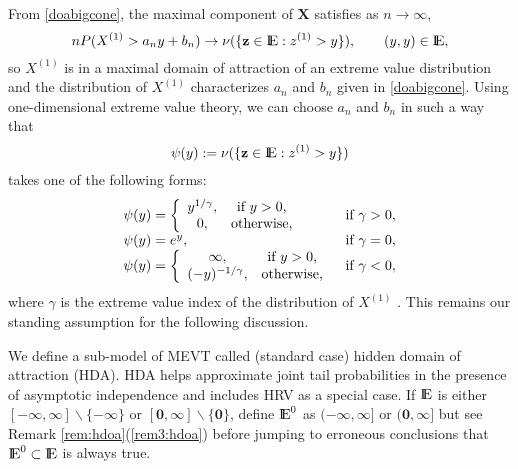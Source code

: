 \documentclass[11 pt]{amsart}
\numberwithin{equation}{section}
\begin{document}
{}From \eqref{doabigcone}, the maximal component of ${\boldsymbol X}$ satisfies as
$n\to\infty$, 
\begin{equation}\label{eqn:maxdoa}
nP( X^{(1)} > a_n y + b_n) \to \nu( \{{\bf{z}} \in {\mathop{\rm I\kern -0.20em E}\nolimits}: z^{(1)} > y
\}),\qquad (y, y) \in {\mathop{\rm I\kern -0.20em E}\nolimits}, 
\end{equation}
so $X^{(1)}$ is in a maximal domain of attraction of an extreme value
distribution and the distribution of $X^{(1)}$ characterizes $a_n$ and
$b_n$ given in \eqref{doabigcone}. Using one-dimensional extreme value
theory, we can choose $a_n$ and $b_n$ in such a way that  
\begin{equation}\label{defn:psi}
\psi(y) := \nu( \{{\bf{z}} \in {\mathop{\rm I\kern -0.20em E}\nolimits}: z^{(1)} > y \})
\end{equation}
takes one of the following forms: 
\begin{align*}
\begin{array}{lc}
\psi(y) = \left \{ \begin{array}{cc}
y^{1/\gamma}, & \hbox{if $y > 0$,}\\
0, & \hbox{otherwise,}
\end{array} \right. & \hbox{if $ \gamma > 0,$}\\
 \psi(y) = e^{y}, & \hbox{if $ \gamma = 0,$}\\
 \psi(y) = \left \{ \begin{array}{cc}
\infty, & \hbox{if $y > 0$,}\\
(-y)^{-1/\gamma}, & \hbox{otherwise,}
\end{array} \right. & \hbox{if $ \gamma < 0,$}
\end{array}
\end{align*}
where $\gamma$ is the extreme value index of the distribution of $X^{(1)}$ \cite[page 9]{resnickbook:2008}. This remains our standing assumption for the following discussion.

We define a sub-model of MEVT {called (standard case) hidden domain of
attraction (HDA)}. HDA  helps approximate  joint tail 
probabilities in the presence of asymptotic independence and 
 includes HRV as a
special case. If ${\mathop{\rm I\kern -0.20em E}\nolimits}$ is either $[-{\boldsymbol \infty}, {\boldsymbol \infty}] \backslash \{ -{\boldsymbol \infty} \}$
or $ {[{\boldsymbol 0}, {\boldsymbol \infty}]} \backslash \{ {\boldsymbol 0} \}$, define
${\mathop{\rm I\kern -0.20em E}\nolimits}^0$ as ${(-{\boldsymbol \infty}, {\boldsymbol \infty}]}$ or $ ({\boldsymbol 0}, {\boldsymbol \infty}]$ but
see Remark \ref{rem:hdoa}(\ref{rem3:hdoa}) before jumping to erroneous conclusions
that ${\mathop{\rm I\kern -0.20em E}\nolimits}^0\subset {\mathop{\rm I\kern -0.20em E}\nolimits}$ is always true.
\end{document}
